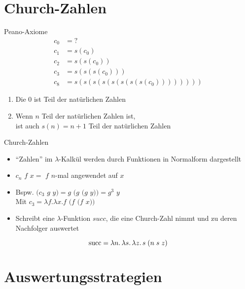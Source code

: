 \documentclass{beamer}
\begin{document}
\section{Church-Zahlen}

\begin{frame}{Peano-Axiome}
	\begin{eqnarray*}
		c_0 &= ?\\
		c_1 &= s (c_0)\\
		c_2 &= s (s (c_0))\\
		c_3 &= s (s (s (c_0)))\\
		c_8 &= s (s (s (s (s (s (s (s (c_0))))))))
	\end{eqnarray*}

	\begin{enumerate}
		\item Die 0 ist Teil der natürlichen Zahlen
		\item Wenn $n$ Teil der natürlichen Zahlen ist,\\
	 	      ist auch $s(n) = n + 1$ Teil der natürlichen Zahlen
	\end{enumerate}
\end{frame}

\begin{frame}{Church-Zahlen}
	\begin{itemize}
		\item \enquote{Zahlen} im $\lambda$-Kalkül werden durch Funktionen in Normalform dargestellt
		\item $c_n$ $f$ $x =$ $f$ $n$-mal angewendet auf $x$
		\item Bspw. $(c_3$ $g$ $y) = g$ $(g $ $(g$ $y)) = g^3$ $y$\\
		      Mit $c_3 = \lambda{}f.\lambda{}x.f$ $(f $ $(f$ $x))$
		\item Schreibt eine $\lambda$-Funktion $succ$, die eine Church-Zahl nimmt und zu deren Nachfolger auswertet
              \end{itemize}
              \pause

              \begin{equation*}
                \csucc = \lam{n}{\lam{s}{\lam{z}{
                  \app{s}{(
                    \app{n}{\app{s}{z}}
                  )}
                }}}
              \end{equation*}
\end{frame}

\section{Auswertungsstrategien}
\end{document}
